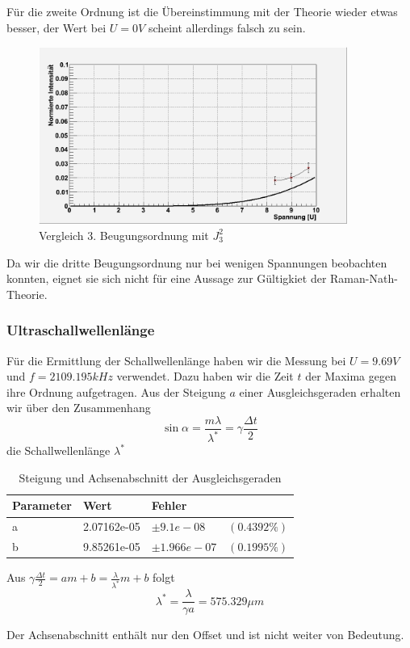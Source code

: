 Für die zweite Ordnung ist die Übereinstimmung mit der Theorie wieder etwas besser, der Wert bei $U=0V$ scheint allerdings falsch zu sein.
\begin{figure}[H]
 \includegraphics[width=0.9\textwidth]{Bilder/raman/raman-fit_3.png}
 \caption{Vergleich 3. Beugungsordnung mit $J_3^2$}
\end{figure}
Da wir die dritte Beugungsordnung nur bei wenigen Spannungen beobachten konnten, eignet sie sich nicht für eine Aussage zur Gültigkiet der Raman-Nath-Theorie.

\subsubsection{Ultraschallwellenlänge}

Für die Ermittlung der Schallwellenlänge haben wir die Messung bei $ U = 9.69 V$ und $f = 2109.195 kHz $ verwendet. Dazu haben wir die Zeit $t$ der Maxima gegen ihre Ordnung aufgetragen. Aus der Steigung $a$ einer Ausgleichsgeraden erhalten wir über den Zusammenhang 
$$ \sin \alpha = \frac{m \lambda}{\lambda^{*}} = \gamma \frac{\Delta t}{2} $$
 die Schallwellenlänge $ \lambda^* $


\begin{table}[H]
\begin{center}
\caption{Steigung und Achsenabschnitt der Ausgleichsgeraden}
\begin{tabular}{llll}
\toprule
Parameter & Wert & Fehler & \\
\midrule
a & 2.07162e-05   &  $ \pm 9.1e-08$  &    $(0.4392\%)$\\
b & 9.85261e-05 & $ \pm 1.966e-07$ &   $(0.1995\%)$ \\
\bottomrule
\end{tabular}
\end{center}
\end{table}


Aus $ \gamma \frac{\Delta t}{2} = a m + b = \frac{\lambda}{\lambda^*} m + b $ folgt 
$$\boxed{ \lambda^* = \frac{\lambda}{\gamma a} = 575.329 \mu m}$$

Der Achsenabschnitt enthält nur den Offset und ist nicht weiter von Bedeutung. 
